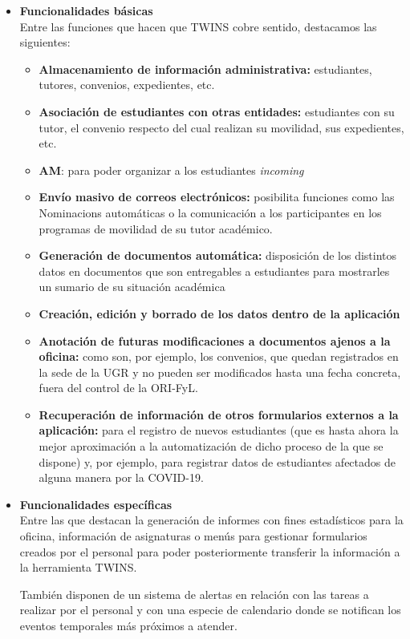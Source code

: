 \begin{itemize}
	\item \textbf{Funcionalidades básicas}\\
	Entre las funciones que hacen que TWINS cobre sentido, destacamos las siguientes:
	
	\begin{itemize}
		\item \textbf{Almacenamiento de información administrativa:} estudiantes, tutores, convenios, expedientes, etc.
		\item \textbf{Asociación de estudiantes con otras entidades:} estudiantes con su tutor, el convenio respecto del cual realizan su movilidad, sus expedientes, etc.
		\item \textbf{\gls{AM}}: para poder organizar a los estudiantes \textit{incoming}
		\item \textbf{Envío masivo de correos electrónicos:} posibilita funciones como las \glspl{Nominacion} automáticas o la comunicación a los participantes en los programas de movilidad de su tutor académico.
		\item \textbf{Generación de documentos automática:} disposición de los distintos datos en documentos que son entregables a estudiantes para mostrarles un sumario de su situación académica
		\item \textbf{Creación, edición y borrado de los datos dentro de la aplicación}
		\item \textbf{Anotación de futuras modificaciones a documentos ajenos a la oficina:} como son, por ejemplo, los convenios, que quedan registrados en la sede de la UGR y no pueden ser modificados hasta una fecha concreta, fuera del control de la ORI-FyL.
		\item \textbf{Recuperación de información de otros formularios externos a la aplicación:} para el registro de nuevos estudiantes (que es hasta ahora la mejor aproximación a la automatización de dicho proceso de la que se dispone) y, por ejemplo, para registrar datos de estudiantes afectados de alguna manera por la COVID-19.
	\end{itemize}

	\item \textbf{Funcionalidades específicas}\\
	Entre las que destacan la generación de informes con fines estadísticos para la oficina, información de asignaturas o menús para gestionar formularios creados por el personal para poder posteriormente transferir la información a la herramienta TWINS.
	
	También disponen de un sistema de alertas en relación con las tareas a realizar por el personal y con una especie de calendario donde se notifican los eventos temporales más próximos a atender.
\end{itemize}

